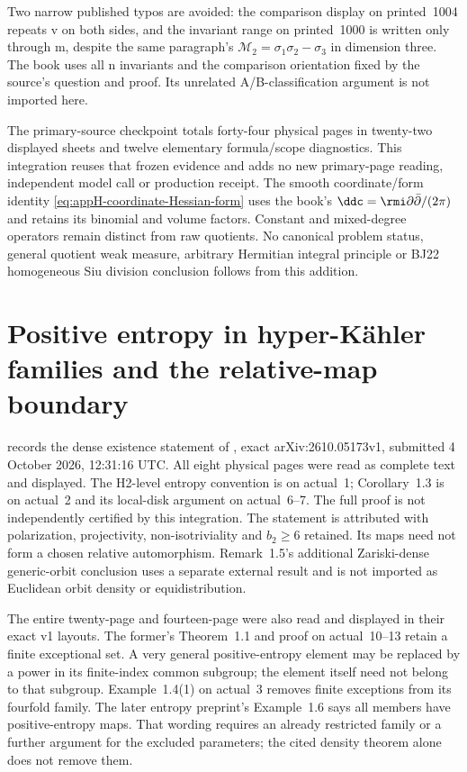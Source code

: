 Two narrow published typos are avoided: the comparison
display on printed~1004 repeats v on both sides, and the
invariant range on printed~1000 is written only through m,
despite the same paragraph's
\(\mathcal M_2=\sigma_1\sigma_2-\sigma_3\) in dimension three.
The book uses all n invariants and the comparison orientation
fixed by the source's question and proof. Its unrelated
A/B-classification argument is not imported here.

The primary-source checkpoint totals forty-four physical
pages in twenty-two displayed sheets and twelve elementary
formula/scope diagnostics. This integration reuses that
frozen evidence and adds no new primary-page reading,
independent model call or production receipt. The smooth
coordinate/form identity
\eqref{eq:appH-coordinate-Hessian-form} uses the book's
\(\ddc=\rmi\partial\bar\partial/(2\pi)\) and retains
its binomial and volume factors. Constant and mixed-degree
operators remain distinct from raw quotients. No canonical
problem status, general quotient weak measure, arbitrary
Hermitian integral principle or BJ22 homogeneous Siu
division conclusion follows from this addition.

\section{Positive entropy in hyper-K\"ahler families and the relative-map boundary}
\label{sec:provenance-HK-group-entropy}

 records the dense existence
statement of \cite[Theorem~1.1]{DenisiEtAl26EntropyV1}, exact
arXiv:2610.05173v1, submitted 4 October 2026, 12:31:16 UTC.
All eight physical pages were read as complete text and displayed.
The H2-level entropy convention is on actual~1; Corollary~1.3
is on actual~2 and its local-disk argument on actual~6--7.
The full proof is not independently certified by this integration.
The statement is attributed with polarization, projectivity,
non-isotriviality and $b_2\geq6$ retained. Its maps need not
form a chosen relative automorphism. Remark~1.5's additional
Zariski-dense generic-orbit conclusion uses a separate external
result and is not imported as Euclidean orbit density or
equidistribution.

The entire twenty-page \cite{DenisiEtAl26GroupsV1} and
fourteen-page \cite{AmerikSoldatenkovVerbitsky26V1} were also
read and displayed in their exact v1 layouts. The former's
Theorem~1.1 and proof on actual~10--13 retain a finite
exceptional set. A very general positive-entropy element may
be replaced by a power in its finite-index common subgroup;
the element itself need not belong to that subgroup. Example~1.4(1)
on actual~3 removes finite exceptions from its fourfold family.
The later entropy preprint's Example~1.6 says all members have
positive-entropy maps. That wording requires an already restricted
family or a further argument for the excluded parameters; the
cited density theorem alone does not remove them.

